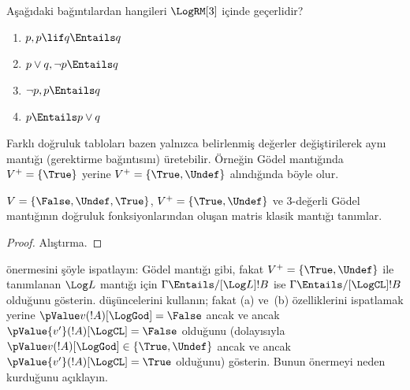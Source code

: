 \begin{prob}
  Aşağıdaki bağıntılardan hangileri $\LogRM[3]$ içinde geçerlidir?
  \begin{enumerate}
    \item $p, p \lif q \Entails q$
    \item $p \lor q, \lnot p \Entails q$
    \item $\lnot p, p \Entails q$
    \item $p \Entails p \lor q$
  \end{enumerate}
\end{prob}

Farklı doğruluk tabloları bazen yalnızca belirlenmiş değerler değiştirilerek
aynı mantığı (gerektirme bağıntısını) üretebilir. Örneğin G\"odel mantığında
$V^+ = \{\True\}$ yerine $V^+ = \{\True, \Undef\}$ alındığında böyle olur.

\begin{prop}
  $V = \{\False, \Undef,\True\}$, $V^+=\{\True, \Undef\}$ ve $3$-değerli
  G\"odel mantığının doğruluk fonksiyonlarından oluşan matris klasik mantığı
  tanımlar.
\end{prop}

\begin{proof}
  Alıştırma.
\end{proof}

\begin{prob}
   önermesini şöyle ispatlayın:
  G\"odel mantığı gibi, fakat $V^+=\{\True,\Undef\}$ ile tanımlanan
  $\Log L$ mantığı için $\Gamma \Entails/[\Log L] !B$ ise
  $\Gamma \Entails/[\LogCL] !B$ olduğunu gösterin.
   düşüncelerini kullanın; fakat
  (a) ve~(b) özelliklerini ispatlamak yerine
  $\pValue v(!A)[\LogGod] = \False$ ancak ve ancak
  $\pValue {v'}(!A)[\LogCL] = \False$ olduğunu (dolayısıyla
  $\pValue v(!A)[\LogGod] \in \{\True,\Undef\}$ ancak ve ancak
  $\pValue {v'}(!A)[\LogCL] = \True$ olduğunu) gösterin. Bunun önermeyi
  neden kurduğunu açıklayın.
\end{prob}


